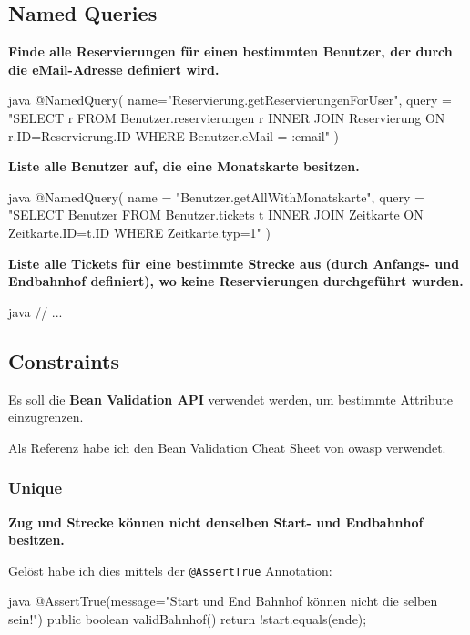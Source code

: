 \clearpage
\subsection{Named Queries}

\textbf{Finde alle Reservierungen für einen bestimmten Benutzer, der durch die eMail-Adresse definiert wird.}

\begin{code}{java}
@NamedQuery(
    name="Reservierung.getReservierungenForUser",
    query = "SELECT r FROM Benutzer.reservierungen r INNER JOIN Reservierung ON r.ID=Reservierung.ID WHERE Benutzer.eMail = :email"
)
\end{code}

\textbf{Liste alle Benutzer auf, die eine Monatskarte besitzen.}

\begin{code}{java}
@NamedQuery(
    name = "Benutzer.getAllWithMonatskarte",
    query = "SELECT Benutzer FROM Benutzer.tickets t INNER JOIN Zeitkarte ON Zeitkarte.ID=t.ID WHERE Zeitkarte.typ=1"
)
\end{code}

\textbf{Liste alle Tickets für eine bestimmte Strecke aus (durch Anfangs- und Endbahnhof definiert), wo keine Reservierungen durchgeführt wurden.}

\begin{code}{java}
// ...
\end{code}

\clearpage
\subsection{Constraints}

Es soll die \textbf{Bean Validation API} verwendet werden, um bestimmte Attribute einzugrenzen.

Als Referenz habe ich den Bean Validation Cheat Sheet von owasp \cite{owasp:beanValidationCheatSheet} verwendet.

\subsubsection{Unique}
\textbf{Zug und Strecke können nicht denselben Start- und Endbahnhof besitzen.}

Gelöst habe ich dies mittels der \texttt{@AssertTrue} Annotation:

\begin{code}{java}
@AssertTrue(message="Start und End Bahnhof können nicht die selben sein!")
public boolean validBahnhof() {
    return !start.equals(ende);
}
\end{code}

